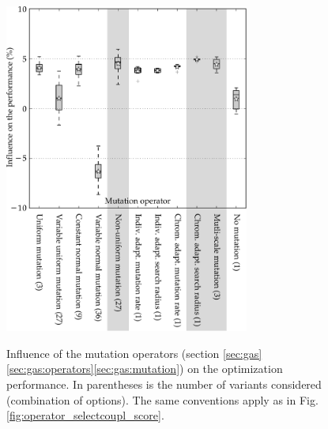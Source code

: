 \documentclass{ametsoc}
\begin{document}
\begin{figure}[t]
	\begin{center}
		\noindent\includegraphics[width=19pc,angle=0]{fig09.pdf}\\
	\end{center}
	\caption{Influence of the mutation operators (section \ref{sec:gas}\ref{sec:gas:operators}\ref{sec:gas:mutation}) on the optimization performance. In parentheses is the number of variants considered (combination of options). The same conventions apply as in Fig. \ref{fig:operator_selectcoupl_score}.}
	\label{fig:operator_mutation_score}
\end{figure}
\end{document}
